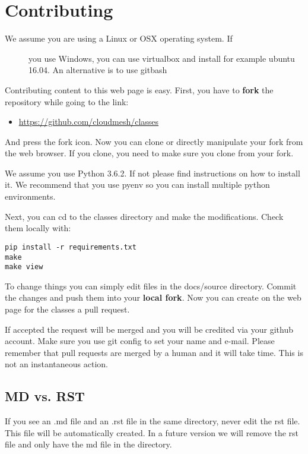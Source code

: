 \section{Contributing}\label{contributing}

\begin{description}
\item[We assume you are using a Linux or OSX operating system. If]
you use Windows, you can use virtualbox and install for example ubuntu
16.04. An alternative is to use gitbash
\end{description}

Contributing content to this web page is easy. First, you have to
\textbf{fork} the repository while going to the link:

\begin{itemize}
\tightlist
\item
  \url{https://github.com/cloudmesh/classes}
\end{itemize}

And press the fork icon. Now you can clone or directly manipulate your
fork from the web browser. If you clone, you need to make sure you clone
from your fork.

We assume you use Python 3.6.2. If not please find instructions on how
to install it. We recommend that you use pyenv so you can install
multiple python environments.

Next, you can cd to the classes directory and make the modifications.
Check them locally with:

\begin{verbatim}
pip install -r requirements.txt
make
make view
\end{verbatim}

To change things you can simply edit files in the docs/source directory.
Commit the changes and push them into your \textbf{local fork}. Now you
can create on the web page for the classes a pull request.

If accepted the request will be merged and you will be credited via your
github account. Make sure you use git config to set your name and
e-mail. Please remember that pull requests are merged by a human and it
will take time. This is not an instantaneous action.

\subsection{MD vs. RST}\label{md-vs.-rst}

If you see an .md file and an .rst file in the same directory, never
edit the rst file. This file will be automatically created. In a future
version we will remove the rst file and only have the md file in the
directory.

